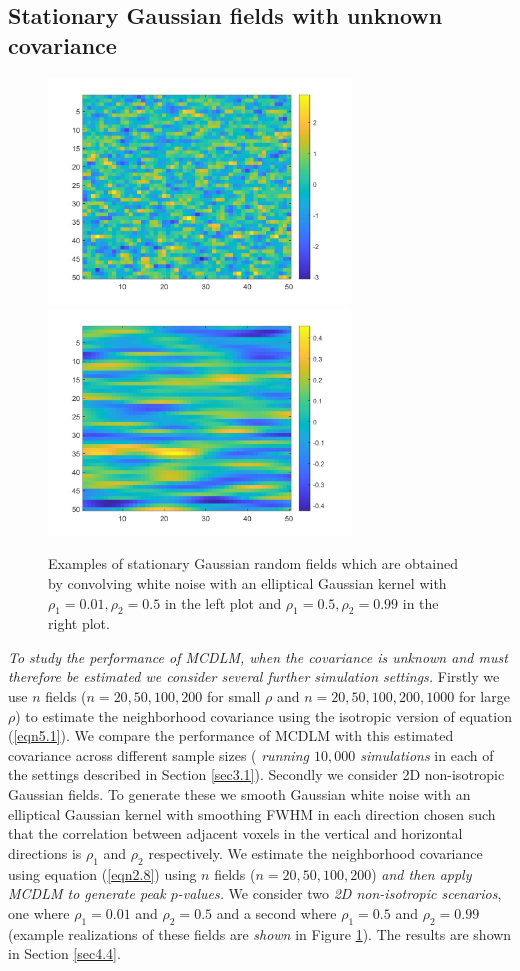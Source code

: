 \documentclass{article}
\newcommand{\nt}[1]{\textit{\color{red} #1}}
\begin{document}
\subsection{Stationary Gaussian fields with unknown covariance}
\label{sec3.3}
\begin{figure}[!htp]
\centering
\includegraphics[width = 8cm]{figure/rho0_01_0_5.jpg}
\includegraphics[width = 8cm]{figure/rho0_5_0_99.jpg}
\caption{Examples of stationary Gaussian random fields which are obtained by convolving white noise with an elliptical Gaussian kernel with $\rho_1 = 0.01, \rho_2 = 0.5$ in the left plot and $\rho_1 = 0.5, \rho_2 = 0.99$ in the right plot.\label{fig16}}
\end{figure}
\nt{To study the performance of MCDLM, when the covariance is unknown and must therefore be estimated we consider several further simulation settings.} Firstly we use $n$ fields ($n = 20, 50, 100, 200$ for small $\rho$ and $n = 20, 50, 100, 200, 1000$ for large $\rho$) to estimate the neighborhood covariance using the isotropic version of equation (\ref{eqn5.1}). We compare the performance of MCDLM with this estimated covariance across different sample sizes (\nt{running $10{,}000$ simulations} in each of the settings described in Section \ref{sec3.1}). Secondly we consider 2D non-isotropic Gaussian fields. To generate these we smooth Gaussian white noise with an elliptical Gaussian kernel with smoothing FWHM in each direction chosen such that the correlation between adjacent voxels in the vertical and horizontal directions is $\rho_1$ and $\rho_2$ respectively. We estimate the neighborhood covariance using equation (\ref{eqn2.8}) using $n$ fields ($n = 20, 50, 100, 200$) \nt{and then apply MCDLM to generate peak $p$-values.} We consider two \nt{2D non-isotropic scenarios}, one where $\rho_1 = 0.01$ and $\rho_2 = 0.5$ and a second where $\rho_1 = 0.5$ and $\rho_2 = 0.99$ (example realizations of these fields are \nt{shown} in Figure \ref{fig16}). The results are shown in Section \ref{sec4.4}. 
\end{document}
